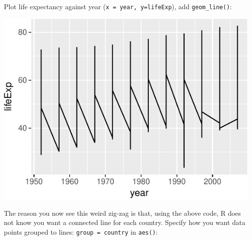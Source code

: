 \documentclass[12pt,]{krantz}
\makeatletter
\newenvironment{Shaded}{\begin{snugshade}}{\end{snugshade}}
\newcommand{\DataTypeTok}[1]{\textcolor[rgb]{0.13,0.29,0.53}{#1}}
\newcommand{\KeywordTok}[1]{\textcolor[rgb]{0.13,0.29,0.53}{\textbf{#1}}}
\newcommand{\NormalTok}[1]{#1}
\newcommand{\OperatorTok}[1]{\textcolor[rgb]{0.81,0.36,0.00}{\textbf{#1}}}
\newcommand{\StringTok}[1]{\textcolor[rgb]{0.31,0.60,0.02}{#1}}
\newenvironment{kframe}{%
\medskip{}
\setlength{\fboxsep}{.8em}
 \def\at@end@of@kframe{}%
 \ifinner\ifhmode%
  \def\at@end@of@kframe{\end{minipage}}%
  \begin{minipage}{\columnwidth}%
 \fi\fi%
 \def\FrameCommand##1{\hskip\@totalleftmargin \hskip-\fboxsep
 \colorbox{shadecolor}{##1}\hskip-\fboxsep
     \hskip-\linewidth \hskip-\@totalleftmargin \hskip\columnwidth}%
 \MakeFramed {\advance\hsize-\width
   \@totalleftmargin\z@ \linewidth\hsize
   \@setminipage}}%
 {\par\unskip\endMakeFramed%
 \at@end@of@kframe}
\renewenvironment{Shaded}{\begin{kframe}}{\end{kframe}}
\theoremstyle{definition}
\theoremstyle{definition}
\theoremstyle{definition}
\theoremstyle{remark}
\makeatother
\begin{document}
Plot life expectancy against year (\texttt{x\ =\ year,\ y=lifeExp}), add
\texttt{geom\_line()}:

\begin{Shaded}
\end{Shaded}

\includegraphics{04_plotting_files/figure-latex/unnamed-chunk-4-1.pdf}

The reason you now see this weird zig-zag is that, using the above code,
R does not know you want a connected line for each country. Specify how
you want data points grouped to lines: \texttt{group\ =\ country} in
\texttt{aes()}:

\begin{Shaded}
\end{Shaded}
\end{document}
